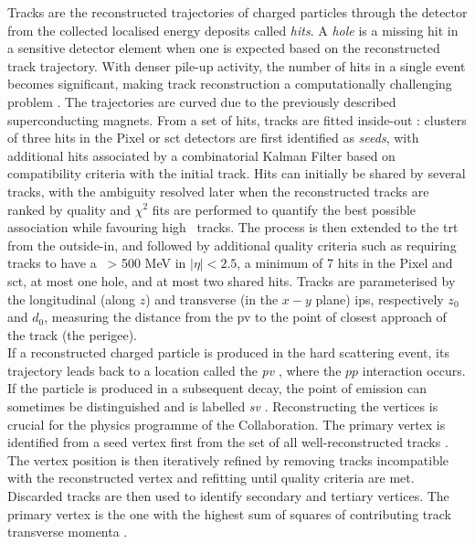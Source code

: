 Tracks are the reconstructed trajectories of charged particles through the detector from the collected localised energy deposits called \textit{hits}. A \textit{hole} is a missing hit in a sensitive detector element when one is expected based on the reconstructed track trajectory. With denser pile-up activity, the number of hits in a single event becomes significant, making track reconstruction a computationally challenging problem \cite{ATL-PHYS-PUB-2015-006, ATLAS-tracks-algo,}. The trajectories are curved due to the previously described superconducting magnets. From a set of hits, tracks are fitted inside-out \cite{ATLAS-tracks-algo}: clusters of three hits in the Pixel or \gls{sct} detectors are first identified as \textit{seeds}, with additional hits associated by a combinatorial Kalman Filter \cite{10.1115/1.3662552} based on compatibility criteria with the initial track. Hits can initially be shared by several tracks, with the ambiguity resolved later when the reconstructed tracks are ranked by quality and $\chi^2$ fits are performed to quantify the best possible association while favouring high \pt\ tracks. The process is then extended to the \gls{trt} from the outside-in, and followed by additional quality criteria such as requiring tracks to have a \pt\ > 500 MeV in $|\eta| < 2.5$, a minimum of 7 hits in the Pixel and \gls{sct}, at most one hole, and at most two shared hits. Tracks are parameterised by the longitudinal (along $z$) and transverse (in the $x-y$ plane) \glspl{ip}, respectively $z_0$ and $d_0$, measuring the distance from the \gls{pv} to the point of closest approach of the track (the perigee). \\

If a reconstructed charged particle is produced in the hard scattering event, its trajectory leads back to a location called the \textit{\gls{pv}} \cite{ATLAS:2016nnj}, where the $pp$ interaction occurs. If the particle is produced in a subsequent decay, the point of emission can sometimes be distinguished and is labelled \textit{\gls{sv}} \cite{Kostyukhin:685551}. Reconstructing the vertices is crucial for the physics programme of the Collaboration. The primary vertex is identified from a seed vertex first from the set of all well-reconstructed tracks \cite{ATL-PHYS-PUB-2015-026}. The vertex position is then iteratively refined by removing tracks incompatible with the reconstructed vertex and refitting until quality criteria are met. Discarded tracks are then used to identify secondary and tertiary vertices. The primary vertex is the one with the highest sum of squares of contributing track transverse momenta \pt. \\

